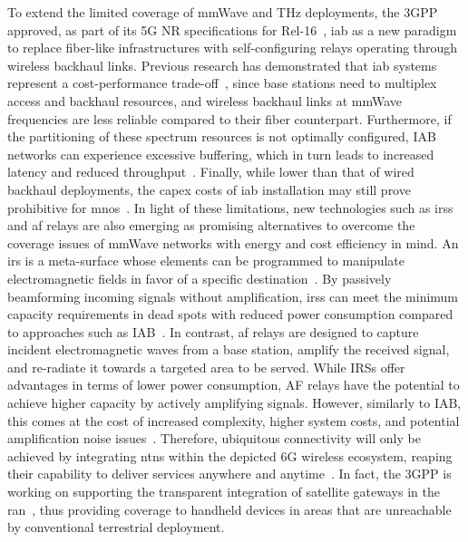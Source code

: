To extend the limited coverage of mmWave and THz deployments, the 3GPP approved, as part of its 5G NR specifications for Rel-16~\cite{3gpp_38_874}, \gls{iab} as a new paradigm to replace fiber-like infrastructures with self-configuring relays operating through wireless backhaul links.
Previous research has demonstrated that \gls{iab} systems represent a cost-performance trade-off~\cite{polese2020integrated}, since base stations need to multiplex access and backhaul resources, and wireless backhaul links at mmWave frequencies are less reliable compared to their fiber counterpart.
Furthermore, if the partitioning of these spectrum resources is not optimally configured, IAB networks can experience excessive buffering, which in turn leads to increased latency and reduced throughput~\cite{8514996}. Finally, while lower than that of wired backhaul deployments, the \gls{capex} costs of \gls{iab} installation may still prove prohibitive for \glspl{mno}~\cite{chaoub20216g}.
In light of these limitations, new technologies such as \glspl{irs} and \gls{af} relays are also emerging as promising alternatives to overcome the coverage issues of mmWave networks with energy and cost efficiency in mind.
An \gls{irs} is a meta-surface whose elements can be programmed to manipulate electromagnetic fields in favor of a specific destination~\cite{wu2021intelligent}. By passively beamforming incoming signals without amplification, \glspl{irs} can meet the minimum capacity requirements in dead spots with reduced power consumption compared to approaches such as IAB~\cite{bjornson2019intelligent}. In contrast, \gls{af} relays are designed to capture incident electromagnetic waves from a base station, amplify the received signal, and re-radiate it towards a targeted area to be served.
While IRSs offer advantages in terms of lower power consumption, AF relays have the potential to achieve higher capacity by actively amplifying signals. However, similarly to IAB, this comes at the cost of increased complexity, higher system costs, and potential amplification noise issues~\cite{huang2019reconfigurable}.
Therefore, ubiquitous connectivity will only be achieved by integrating \glspl{ntn} within the depicted 6G wireless ecosystem, reaping their capability to deliver services anywhere and anytime~\cite{8766143}. In fact, the 3GPP is working on supporting the transparent integration of satellite gateways in the \gls{ran}~\cite{38821}, thus providing coverage to handheld devices in areas that are unreachable by conventional terrestrial deployment.

